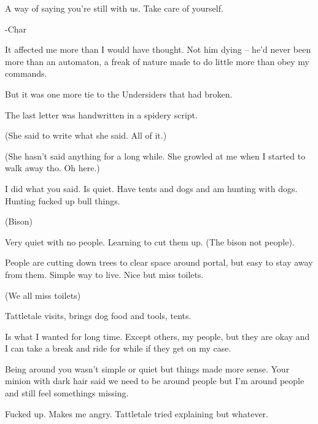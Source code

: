 A way of saying you're still with us.  Take care of yourself.



-Char



It affected me more than I would have thought.  Not him dying – he'd never been more than an automaton, a freak of nature made to do little more than obey my commands.



But it was one more tie to the Undersiders that had broken.



The last letter was handwritten in a spidery script.



(She said to write what she said.  All of it.)



(She hasn't said anything for a long while.  She growled at me when I started to walk away tho.  Oh here.)



I did what you said.  Is quiet.  Have tents and dogs and am hunting with dogs.  Hunting fucked up bull things.



(Bison)



Very quiet with no people.  Learning to cut them up.  (The bison not people).



People are cutting down trees to clear space around portal, but easy to stay away from them.  Simple way to live.  Nice but miss toilets.



(We all miss toilets)



Tattletale visits, brings dog food and tools, tents.



Is what I wanted for long time.  Except others, my people, but they are okay and I can take a break and ride for while if they get on my case.



Being around you wasn't simple or quiet but things made more sense.  Your minion with dark hair said we need to be around people but I'm around people and still feel somethings missing.



Fucked up.  Makes me angry.  Tattletale tried explaining but whatever.



